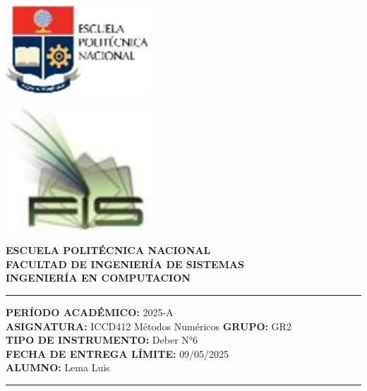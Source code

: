 \documentclass[12pt]{article}
\begin{document}
\begin{minipage}{0.45\textwidth}
    \includegraphics[width=0.4\textwidth]{inFiles/Figures/epnLogo.jpg}
\end{minipage}
\hfill
\begin{minipage}{0.45\textwidth}
    \raggedleft
    \includegraphics[width=0.4\textwidth]{inFiles/Figures/FIS_logo.jpg}
\end{minipage}

\vspace{0.5cm}

\begin{center}
    \textbf{ESCUELA POLITÉCNICA NACIONAL}\\[0.2cm]
    \textbf{FACULTAD DE INGENIERÍA DE SISTEMAS}\\[0.2cm]
    \textbf{INGENIERÍA {\textbf{EN COMPUTACION}}}
\end{center}

\vspace{0.5cm}
\hrule
\vspace{0.5cm}

\noindent\textbf{PERÍODO ACADÉMICO:} 2025-A\\[0.2cm]
\noindent\textbf{ASIGNATURA:} ICCD412 Métodos Numéricos \hfill \textbf{GRUPO:} GR2\\[0.2cm]
\noindent\textbf{TIPO DE INSTRUMENTO:} {Deber N°6}\\[0.2cm]
\noindent\textbf{FECHA DE ENTREGA LÍMITE:} {09/05/2025}\\[0.2cm]
\noindent\textbf{ALUMNO:} {Lema Luis}

\vspace{0.5cm}
\hrule
\vspace{1cm}
\end{document}
